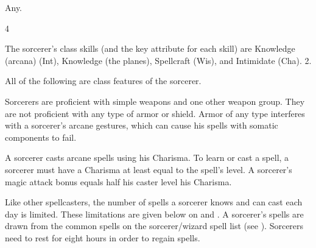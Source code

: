  Any.

 4

The sorcerer's class skills (and the key attribute for each skill) are Knowledge (arcana) (Int), Knowledge (the planes), Spellcraft (Wis), and Intimidate (Cha).
 2.

All of the following are class features of the sorcerer.

   Sorcerers are proficient with simple weapons  and one other weapon group.  They are not proficient with any type of armor or shield. Armor of any type interferes with a sorcerer's arcane gestures, which can cause his spells with somatic components to fail.

 A sorcerer casts arcane spells using his Charisma.  To learn or cast a spell, a sorcerer must have a Charisma at least equal to the spell's level. A sorcerer's magic attack bonus equals half his caster level \add his Charisma.

Like other spellcasters, the number of spells a sorcerer knows and can cast each day is limited. These limitations are given below on  and . A sorcerer's spells are drawn from the common spells on the sorcerer/wizard spell list (see ). Sorcerers need to rest for eight hours in order to regain spells.

